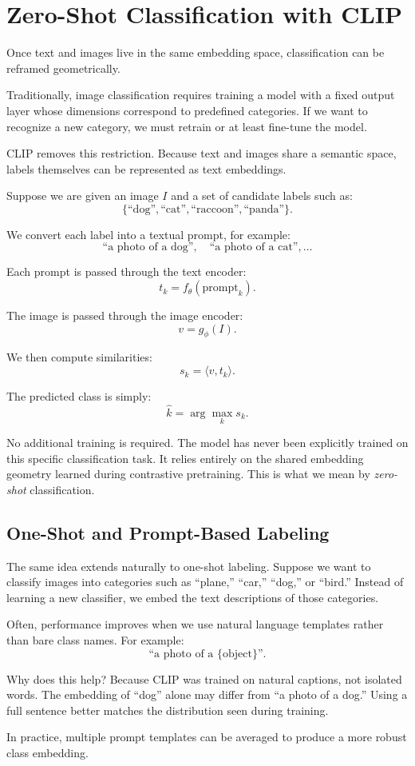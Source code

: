 \section{Zero-Shot Classification with CLIP}
\medskip

Once text and images live in the same embedding space, classification can be reframed geometrically.

Traditionally, image classification requires training a model with a fixed output layer whose dimensions correspond to predefined categories. If we want to recognize a new category, we must retrain or at least fine-tune the model.

CLIP removes this restriction. Because text and images share a semantic space, labels themselves can be represented as text embeddings.

Suppose we are given an image $I$ and a set of candidate labels such as:
\[
\{\text{``dog''}, \text{``cat''}, \text{``raccoon''}, \text{``panda''}\}.
\]

We convert each label into a textual prompt, for example:
\[
\text{``a photo of a dog''}, \quad
\text{``a photo of a cat''}, \dots
\]

Each prompt is passed through the text encoder:
\[
t_k = f_\theta(\text{prompt}_k).
\]

The image is passed through the image encoder:
\[
v = g_\phi(I).
\]

We then compute similarities:
\[
s_k = \langle v, t_k \rangle.
\]

The predicted class is simply:
\[
\hat{k} = \arg\max_k s_k.
\]

No additional training is required. The model has never been explicitly trained on this specific classification task. It relies entirely on the shared embedding geometry learned during contrastive pretraining. This is what we mean by \emph{zero-shot} classification.

\bigskip
\subsection{One-Shot and Prompt-Based Labeling}
\medskip

The same idea extends naturally to one-shot labeling. Suppose we want to classify images into categories such as ``plane,'' ``car,'' ``dog,'' or ``bird.'' Instead of learning a new classifier, we embed the text descriptions of those categories.

Often, performance improves when we use natural language templates rather than bare class names. For example:
\[
\text{``a photo of a \{object\}''}.
\]

Why does this help? Because CLIP was trained on natural captions, not isolated words. The embedding of ``dog'' alone may differ from ``a photo of a dog.'' Using a full sentence better matches the distribution seen during training.

In practice, multiple prompt templates can be averaged to produce a more robust class embedding.

\bigskip

